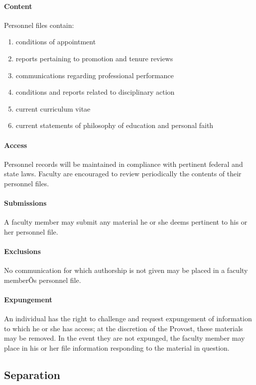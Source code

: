 \documentclass[letterpaper, 11pt]{article}
\begin{document}
			\paragraph{Content}
				Personnel files contain:
				\begin{enumerate}[label=\alph*)]
					\item{conditions of appointment}
					\item{reports pertaining to promotion and tenure reviews}
					\item{communications regarding professional performance}
					\item{conditions and reports related to disciplinary action}
					\item{current curriculum vitae}
					\item{current statements of philosophy of education and personal faith}
				\end{enumerate}
			\paragraph{Access}
				Personnel records will be maintained in compliance with pertinent federal and state laws.  Faculty are encouraged to review periodically the contents of their personnel files.
			\paragraph{Submissions}
				A faculty member may submit any material he or she deems pertinent to his or her personnel file.
			\paragraph{Exclusions}
				No communication for which authorship is not given may be placed in a faculty memberÕs personnel file.
			\paragraph{Expungement}
				An individual has the right to challenge and request expungement of information to which he or she has access; at the discretion of the Provost, these materials may be removed.  In the event they are not expunged, the faculty member may place in his or her file information responding to the material in question.
	\subsection{Separation}
\end{document}
